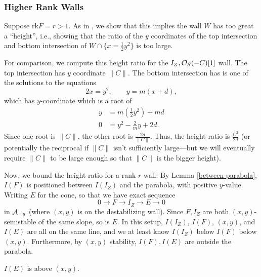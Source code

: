 \documentclass[12pt]{article}
\newcommand{\rk}{\mathrm{rk}}
\begin{document}
\subsubsection{Higher Rank Walls}

Suppose $\rk F = r > 1$. As in \cite{bertram_two_2026}, we show that this implies the wall $W$ has too great a ``height'', i.e., showing that the ratio of the $y$ coordinates of the top intersection and bottom intersection of $W \cap \{x=\frac{1}{2}y^2\}$ is too large.

\begin{computation}
    For comparison, we compute this height ratio for the $I_Z, \mathcal{O}_S(-C)[1]$ wall. The top intersection has $y$ coordinate $\|C\|$. The bottom intersection has is one of the solutions to the equations
    \[2x=y^2, \qquad y=m(x+d),\]
    which has $y$-coordinate which is a root of
    \begin{align*}
        y&=m\left(\frac{1}{2}y^2\right)+md\\
        0&=y^2-\frac{2}{m}y+2d.
    \end{align*}
    Since one root is $\|C\|$, the other root is $\frac{2d}{\|C\|}$. Thus, the height ratio is $\frac{C^2}{2d}$ (or potentially the reciprocal if $\|C\|$ isn't sufficiently large---but we will eventually require $\|C\|$ to be large enough so that $\|C\|$ is the bigger height).
\end{computation}

\bigskip





Now, we bound the height ratio for a rank $r$ wall. By Lemma \ref{between-parabola}, $I(F)$ is positioned between $I(I_Z)$ and the parabola, with positive $y$-value. Writing $E$ for the cone, so that we have exact sequence
\[0\to F \to I_Z \to E \to 0 \tag{$\star$}\]
in $\mathcal{A}_{-y}$ (where $(x,y)$ is on the destabilizing wall). Since $F, I_Z$ are both $(x,y)$-semistable of the same slope, so is $E$. In this setup, $I(I_Z)$, $I(F)$, $(x,y)$, and $I(E)$ are all on the same line, and we at least know $I(I_Z)$ below $I(F)$ below $(x,y)$. Furthermore, by $(x,y)$ stability, $I(F),I(E)$ are outside the parabola.

\begin{prop}
    $I(E)$ is above $(x,y)$.
\end{prop}
\end{document}
